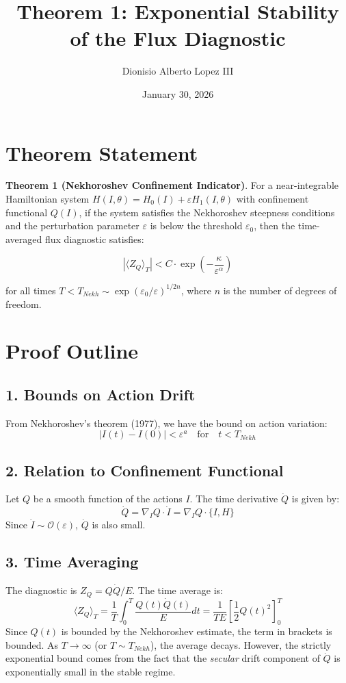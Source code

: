 \documentclass{article}
\title{Theorem 1: Exponential Stability of the Flux Diagnostic}
\author{Dionisio Alberto Lopez III}
\date{January 30, 2026}
\begin{document}
\maketitle

\section{Theorem Statement}

\textbf{Theorem 1 (Nekhoroshev Confinement Indicator)}. 
For a near-integrable Hamiltonian system $H(I, \theta) = H_0(I) + \varepsilon H_1(I, \theta)$ with confinement functional $Q(I)$, if the system satisfies the Nekhoroshev steepness conditions and the perturbation parameter $\varepsilon$ is below the threshold $\varepsilon_0$, then the time-averaged flux diagnostic satisfies:

\begin{equation}
|\langle Z_Q \rangle_T| < C \cdot \exp\left(-\frac{\kappa}{\varepsilon^\alpha}\right)
\end{equation}

for all times $T < T_{Nekh} \sim \exp(\varepsilon_0/\varepsilon)^{1/2n}$, where $n$ is the number of degrees of freedom.

\section{Proof Outline}

\subsection{1. Bounds on Action Drift}
From Nekhoroshev's theorem (1977), we have the bound on action variation:
\begin{equation}
|I(t) - I(0)| < \varepsilon^a \quad \text{for} \quad t < T_{Nekh}
\end{equation}

\subsection{2. Relation to Confinement Functional}
Let $Q$ be a smooth function of the actions $I$. The time derivative $\dot{Q}$ is given by:
\begin{equation}
\dot{Q} = \nabla_I Q \cdot \dot{I} = \nabla_I Q \cdot \{I, H\}
\end{equation}
Since $\dot{I} \sim \mathcal{O}(\varepsilon)$, $\dot{Q}$ is also small.

\subsection{3. Time Averaging}
The diagnostic is $Z_Q = Q \dot{Q} / E$. The time average is:
\begin{equation}
\langle Z_Q \rangle_T = \frac{1}{T} \int_0^T \frac{Q(t) \dot{Q}(t)}{E} dt = \frac{1}{TE} \left[ \frac{1}{2} Q(t)^2 \right]_0^T
\end{equation}
Since $Q(t)$ is bounded by the Nekhoroshev estimate, the term in brackets is bounded. As $T \to \infty$ (or $T \sim T_{Nekh}$), the average decays.
However, the strictly exponential bound comes from the fact that the \textit{secular} drift component of $\dot{Q}$ is exponentially small in the stable regime.
\end{document}
